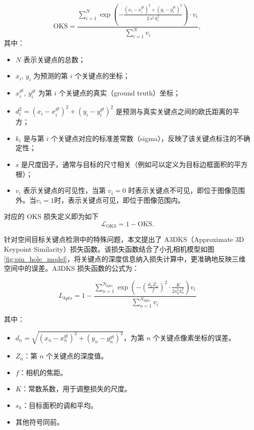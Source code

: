 \begin{equation}
	\mathrm{OKS} = \frac{\sum_{i=1}^{N} \exp\left(-\frac{(x_i - x_i^{gt})^2 + (y_i - y_i^{gt})^2}{2\, s^2 \, k_i^2}\right) \cdot v_i}
	{\sum_{i=1}^{N} v_i},
\end{equation}
其中：
\begin{itemize}
	\item $N$ 表示关键点的总数；
	\item $x_i$, $y_i$ 为预测的第 $i$ 个关键点的坐标；
	\item $x_i^{gt}$, $y_i^{gt}$ 为第 $i$ 个关键点的真实（ground truth）坐标；
	\item $d_i^2 = (x_i - x_i^{gt})^2 + (y_i - y_i^{gt})^2$ 是预测与真实关键点之间的欧氏距离的平方；
	\item $k_i$ 是与第 $i$ 个关键点对应的标准差常数（sigma），反映了该关键点标注的不确定性；
	\item $s$ 是尺度因子，通常与目标的尺寸相关（例如可以定义为目标边框面积的平方根）；
	\item $v_i$ 表示关键点的可见性，当第 $v_i=0$ 时表示关键点不可见，即位于图像范围外。当$v_i=1$时，表示关键点可见，即位于图像范围内。 
\end{itemize}

对应的 OKS 损失定义即为如下
\begin{equation}
	\mathcal{L}_{\text{OKS}} = 1 - \mathrm{OKS}.
\end{equation}


针对空间目标关键点检测中的特殊问题，本文提出了 A3DKS（Approximate 3D Keypoint Similarity）损失函数。该损失函数结合了小孔相机模型如图\ref{fig:pin_hole_model}，将关键点的深度信息纳入损失计算中，更准确地反映三维空间中的误差。A3DKS 损失函数的公式为：

\begin{equation}
	L_{kpts} = 1 - \frac{\sum\limits_{n=1}^{N_{kpts}} \exp \left( -\left( \frac{d_n Z_n}{f} \right)^2 \cdot \frac{K}{2 s_h^2 k_n^2} \right) v_i}{\sum\limits_{n=1}^{N_{kpts}} v_i}
\end{equation}

其中：

\begin{itemize}
	\item $d_n = \sqrt{(x_n - x_n^{gt})^2 + (y_n - y_n^{gt})^2}$，为第 $n$ 个关键点像素坐标的误差。
	\item $Z_n$：第 $n$ 个关键点的深度值。
	\item $f$：相机的焦距。
	\item $K$：常数系数，用于调整损失的尺度。
	\item $s_h$：目标面积的调和平均。
	\item 其他符号同前。
\end{itemize}

